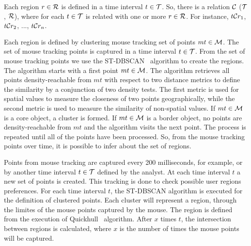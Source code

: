 \documentclass[runningheads,a4paper]{llncs}
\begin{document}
Each region $r \in {\cal R}$ is defined in a time interval $t \in {\cal T}$. So, there is a relation ${\cal C}$ (${\cal T}$, ${\cal R}$), where for each $t \in	{\cal T}$ is related with one or more $r \in {\cal R}$. For instance, $t{\cal C}r_1$, $t{\cal C}r_2$, ..., $t{\cal C}r_n$.  

Each region is defined by clustering mouse tracking set of points $mt \in {\cal M}$. The set of mouse tracking points is captured in a time interval $t \in {\cal T}$. From the set of mouse tracking points we use the ST-DBSCAN~\cite{Birant:2007} algorithm to create the regions. The algorithm starts with a first point  $mt \in {\cal M}$. The algorithm retrieves all points density-reachable from $mt$ with respect to two distance metrics to define the similarity by a conjunction of two density tests. The first metric is used for spatial values to measure the closeness of two points geographically, while the second metric is used to measure the similarity of non-spatial values. If $mt \in {\cal M}$ is a core object, a cluster is formed. If $mt \in {\cal M}$ is a border object, no points are density-reachable from $mt$ and the algorithm visits the next point. The process is repeated until all of the points have been processed. So, from the mouse tracking points over time, it is possible to infer about the set of regions.

Points from mouse tracking are captured every 200 milliseconds, for example, or by another time interval $t \in {\cal T}$ defined by the analyst. At each time interval $t$ a new set of points is created. This tracking is done to check possible user regions preferences. For each time interval $t$, the ST-DBSCAN algorithm is executed for the definition of clustered points. Each cluster will represent a region, through the limites of the mouse points captured by the mouse. The region is defined from the execution of Quickhull~\cite{Barber:1996} algorithm. After $x$ times $t$, the intersection between regions is calculated, where $x$ is the number of times the mouse points will be captured.
 
\end{document}
